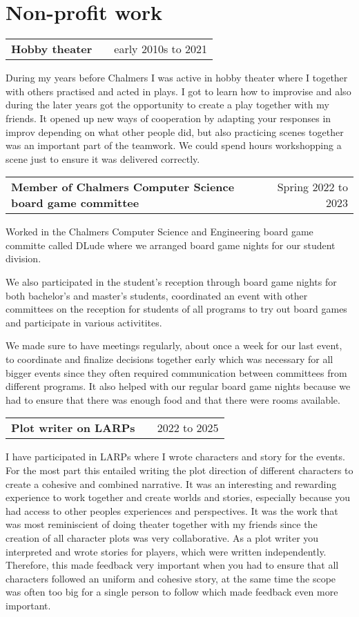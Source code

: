 \documentclass[a4paper,12pt]{article}
\makeatletter
\newenvironment{jobshort}[2]
    {
    \begin{tabularx}{\linewidth}{@{}l X r@{}}
    \textbf{#1} & \hfill &  #2 \\[3.75pt]
    \end{tabularx}
    }
    {
    }
\makeatother
\begin{document}
\section{Non-profit work}

\begin{jobshort}{Hobby theater}{early 2010s to 2021}
During my years before Chalmers I was active in hobby theater where I together with others practised and acted in plays. I got to learn how to improvise and also during the later years got the opportunity to create a play together with my friends. It opened up new ways of cooperation by adapting your responses in improv depending on what other people did, but also practicing scenes together was an important part of the teamwork. We could spend hours workshopping a scene just to ensure it was delivered correctly.
\end{jobshort}

\begin{jobshort}{Member of Chalmers Computer Science board game committee}{Spring 2022 to 2023}
Worked in the Chalmers Computer Science and Engineering board game committe called DLude where we arranged board game nights for our student division. 

We also participated in the student's reception through board game nights for both bachelor's and master's students, coordinated an event with other committees on the reception for students of all programs to try out board games and participate in various activitites. 

We made sure to have meetings regularly, about once a week for our last event, to coordinate and finalize decisions together early which was necessary for all bigger events since they often required communication between committees from different programs. It also helped with our regular board game nights because we had to ensure that there was enough food and that there were rooms available.
\end{jobshort}

\begin{jobshort}{Plot writer on LARPs}{2022 to 2025}
I have participated in LARPs where I wrote characters and story for the events. For the most part this entailed writing the plot direction of different characters to create a cohesive and combined narrative. It was an interesting and rewarding experience to work together and create worlds and stories, especially because you had access to other peoples experiences and perspectives. It was the work that was most reminiscient of doing theater together with my friends since the creation of all character plots was very collaborative. 
As a plot writer you interpreted and wrote stories for players, which were written independently. Therefore, this made feedback very important when you had to ensure that all characters followed an uniform and cohesive story, at the same time the scope was often too big for a single person to follow which made feedback even more important.
\end{jobshort}

\vfill
{}
\end{document}
